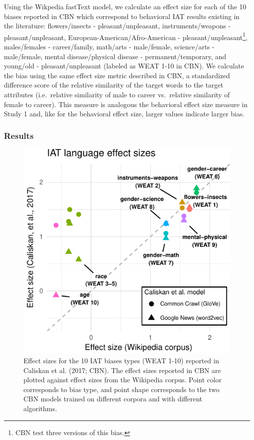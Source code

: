 \documentclass[10pt, letterpaper]{article}
\newenvironment{CodeChunk}{}{}
\begin{document}
Using the Wikpedia fastText model, we calculate an effect size for each
of the 10 biases reported in CBN which correspond to behavioral IAT
results existing in the literature: flowers/insects -
pleasant/unpleasant, instruments/weapons - pleasant/unpleasant,
European-American/Afro-American -
pleasant/unpleasant\footnote{CBN test three versions of this bias.},
males/females - career/family, math/arts - male/female, science/arts -
male/female, mental disease/physical disease - permanent/temporary, and
young/old - pleasant/unpleasant (labeled as WEAT 1-10 in CBN). We
calculate the bias using the same effect size metric described in CBN, a
standardized difference score of the relative similarity of the target
words to the target attributes (i.e.~relative similarity of male to
career vs.~relative similarity of female to career). This measure is
analogous the behavioral effect size measure in Study 1 and, like for
the behavioral effect size, larger values indicate larger bias.

\subsubsection{Results}\label{results-1}

\begin{CodeChunk}
\begin{figure}[t]

{\centering \includegraphics{figs/WEAT_plot-1} 

}

\caption[Effect sizes for the 10 IAT biases types (WEAT 1-10) reported in Caliskan et al]{Effect sizes for the 10 IAT biases types (WEAT 1-10) reported in Caliskan et al. (2017; CBN). The effect sizes reported in CBN are plotted against  effect sizes from the Wikipedia corpus.  Point color corresponds to  bias type, and point shape corresponds to the two CBN models trained on different corpora and with different algorithms.}\label{fig:WEAT_plot}
\end{figure}
\end{CodeChunk}
\end{document}
